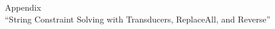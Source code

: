 
\appendix

\begin{center}
{\huge Appendix} \\
{\large ``String Constraint Solving with Transducers, ReplaceAll, and Reverse''}
\end{center}

\bigskip

